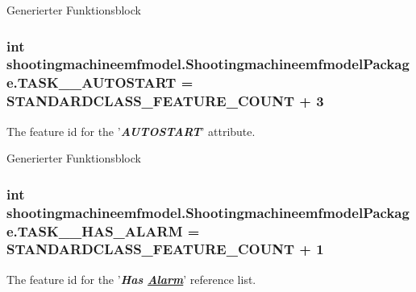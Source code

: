 Generierter Funktionsblock  \hypertarget{interfaceshootingmachineemfmodel_1_1_shootingmachineemfmodel_package_aec71228b1f838eaeb86efe350e5b1a4f}{
\subsubsection[{T\-A\-S\-K\-\_\-\-\_\-\-A\-U\-T\-O\-S\-T\-A\-R\-T}]{\setlength{\rightskip}{0pt plus 5cm}int shootingmachineemfmodel.\-Shootingmachineemfmodel\-Package.\-T\-A\-S\-K\-\_\-\-\_\-\-A\-U\-T\-O\-S\-T\-A\-R\-T = {\bf S\-T\-A\-N\-D\-A\-R\-D\-C\-L\-A\-S\-S\-\_\-\-F\-E\-A\-T\-U\-R\-E\-\_\-\-C\-O\-U\-N\-T} + 3}}\label{interfaceshootingmachineemfmodel_1_1_shootingmachineemfmodel_package_aec71228b1f838eaeb86efe350e5b1a4f}
The feature id for the '{\itshape {\bfseries A\-U\-T\-O\-S\-T\-A\-R\-T}}' attribute.

Generierter Funktionsblock  \hypertarget{interfaceshootingmachineemfmodel_1_1_shootingmachineemfmodel_package_a86b86fa479cfc7162ae9b30bf99faa27}{
\subsubsection[{T\-A\-S\-K\-\_\-\-\_\-\-H\-A\-S\-\_\-\-A\-L\-A\-R\-M}]{\setlength{\rightskip}{0pt plus 5cm}int shootingmachineemfmodel.\-Shootingmachineemfmodel\-Package.\-T\-A\-S\-K\-\_\-\-\_\-\-H\-A\-S\-\_\-\-A\-L\-A\-R\-M = {\bf S\-T\-A\-N\-D\-A\-R\-D\-C\-L\-A\-S\-S\-\_\-\-F\-E\-A\-T\-U\-R\-E\-\_\-\-C\-O\-U\-N\-T} + 1}}\label{interfaceshootingmachineemfmodel_1_1_shootingmachineemfmodel_package_a86b86fa479cfc7162ae9b30bf99faa27}
The feature id for the '{\itshape {\bfseries Has \hyperlink{interfaceshootingmachineemfmodel_1_1_alarm}{Alarm}}}' reference list.

